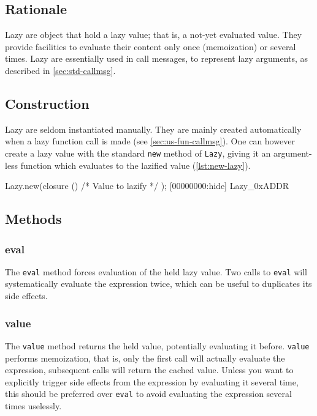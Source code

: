 \subsection{Rationale}

Lazy are object that hold a lazy value; that is, a not-yet evaluated
value. They provide facilities to evaluate their content only once
(memoization) or several times. Lazy are essentially used in call
messages, to represent lazy arguments, as described in
\autoref{sec:std-callmsg}.

\subsection{Construction}

Lazy are seldom instantiated manually. They are mainly created
automatically when a lazy function call is made (see
\autoref{sec:us-fun-callmsg}). One can however create a lazy value with the
standard \lstinline|new| method of \lstinline|Lazy|, giving it an
argument-less function which evaluates to the lazified value
(\autoref{lst:new-lazy}).

\begin{urbiscript}[caption=Creating a lazy value, label=lst:new-lazy,
  float=\floatpos]
Lazy.new(closure () { /* Value to lazify */ });
[00000000:hide] Lazy_0xADDR
\end{urbiscript}

\subsection{Methods}
\subsubsection{eval}

The \lstinline|eval| method forces evaluation of the held lazy
value. Two calls to \lstinline|eval| will systematically evaluate the
expression twice, which can be useful to duplicates its side effects.

\subsubsection{value}

The \lstinline|value| method returns the held value, potentially
evaluating it before. \lstinline|value| performs memoization, that is,
only the first call will actually evaluate the expression, subsequent
calls will return the cached value. Unless you want to explicitly
trigger side effects from the expression by evaluating it several
time, this should be preferred over \lstinline|eval| to avoid
evaluating the expression several times uselessly.

